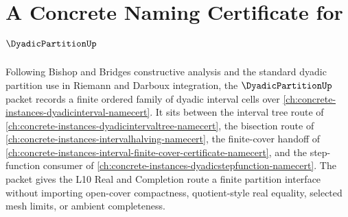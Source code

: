 \chapter{A Concrete Naming Certificate for $\DyadicPartitionUp$}
\label{ch:concrete-instances-dyadic-partition-namecert}

Following Bishop and Bridges constructive analysis and the standard dyadic partition use in Riemann and Darboux integration, the $\DyadicPartitionUp$ packet records a finite ordered family of dyadic interval cells over \autoref{ch:concrete-instances-dyadicinterval-namecert}. It sits between the interval tree route of \autoref{ch:concrete-instances-dyadicintervaltree-namecert}, the bisection route of \autoref{ch:concrete-instances-intervalhalving-namecert}, the finite-cover handoff of \autoref{ch:concrete-instances-interval-finite-cover-certificate-namecert}, and the step-function consumer of \autoref{ch:concrete-instances-dyadicstepfunction-namecert}. The packet gives the L10 Real and Completion route a finite partition interface without importing open-cover compactness, quotient-style real equality, selected mesh limits, or ambient completeness.

